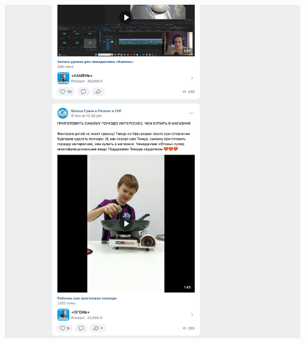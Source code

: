 \Continuing
\begin{center}
    \includegraphics[width=\textwidth]{school-vk-p3}
\end{center}

\pagebreak
